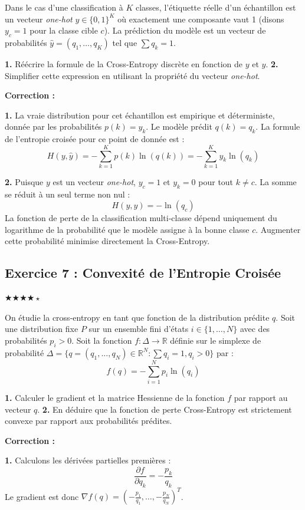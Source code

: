 \documentclass[11pt,a4paper]{article}
\begin{document}
Dans le cas d'une classification à $K$ classes, l'étiquette réelle d'un échantillon est un vecteur \textit{one-hot} $y \in \{0, 1\}^K$ où exactement une composante vaut 1 (disons $y_c = 1$ pour la classe cible $c$). La prédiction du modèle est un vecteur de probabilités $\hat{y} = (q_1, \dots, q_K)$ tel que $\sum q_k = 1$.

\textbf{1.} Réécrire la formule de la Cross-Entropy discrète en fonction de $y$ et $\hat{y}$.
\textbf{2.} Simplifier cette expression en utilisant la propriété du vecteur \textit{one-hot}.

\textbf{Correction :}

\textbf{1.} La vraie distribution pour cet échantillon est empirique et déterministe, donnée par les probabilités $p(k) = y_k$.
Le modèle prédit $q(k) = q_k$.
La formule de l'entropie croisée pour ce point de donnée est :
$$H(y, \hat{y}) = - \sum_{k=1}^K p(k) \ln(q(k)) = - \sum_{k=1}^K y_k \ln(q_k)$$

\textbf{2.} Puisque $y$ est un vecteur \textit{one-hot}, $y_c = 1$ et $y_k = 0$ pour tout $k \neq c$.
La somme se réduit à un seul terme non nul :
$$H(y, \hat{y}) = - \ln(q_c)$$
La fonction de perte de la classification multi-classe dépend uniquement du logarithme de la probabilité que le modèle assigne à la bonne classe $c$. Augmenter cette probabilité minimise directement la Cross-Entropy.


\subsection*{Exercice 7 : Convexité de l'Entropie Croisée }

$\bigstar\bigstar\bigstar\bigstar\star$


On étudie la cross-entropy en tant que fonction de la distribution prédite $q$. Soit une distribution fixe $P$ sur un ensemble fini d'états $i \in \{1, \dots, N\}$ avec des probabilités $p_i > 0$.
Soit la fonction $f: \Delta \to \mathbb{R}$ définie sur le simplexe de probabilité $\Delta = \{q = (q_1, \dots, q_N) \in \mathbb{R}^N : \sum q_i = 1, q_i > 0 \}$ par :
$$f(q) = - \sum_{i=1}^N p_i \ln(q_i)$$

\textbf{1.} Calculer le gradient et la matrice Hessienne de la fonction $f$ par rapport au vecteur $q$.
\textbf{2.} En déduire que la fonction de perte Cross-Entropy est strictement convexe par rapport aux probabilités prédites.

\textbf{Correction :}

\textbf{1.} Calculons les dérivées partielles premières :
$$\frac{\partial f}{\partial q_k} = - \frac{p_k}{q_k}$$
Le gradient est donc $\nabla f(q) = \left( - \frac{p_1}{q_1}, \dots, - \frac{p_N}{q_N} \right)^T$.
\end{document}
